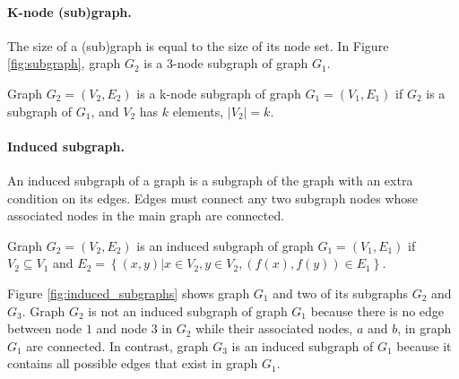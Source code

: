 \paragraph{K-node (sub)graph.}
The size of a (sub)graph is equal to the size of its node set. 
In Figure \ref{fig:subgraph}, graph $G_2$ is a 3-node subgraph of graph $G_1$. 

\begin{definition}
Graph $G_2 = \left( V_2 , E_2 \right)$ is a k-node subgraph of graph $G_1 = \left( V_1, E_1 \right)$ if $G_2$ is a subgraph of $G_1$, and $V_2$ has $k$ elements, $|V_2|=k$. 
\end{definition}

\paragraph{Induced subgraph.} 
An induced subgraph of a graph is a subgraph of the graph with an extra condition on its edges.  
Edges must connect any two subgraph nodes whose associated nodes in the main graph are connected. 

\begin{definition} 
Graph $G_2 = (V_2, E_2)$ is an induced subgraph of graph $G_1 = (V_1, E_1)$ if $V_2 \subseteq V_1$ and 
$E_2 = \left\{ (x,y)| x \in V_2, y \in V_2, (f(x),f(y)) \in E_1  \right\}$.
\end{definition}

Figure \ref{fig:induced_subgraphs} shows graph $G_1$ and two of its subgraphs $G_2$ and $G_3$.  
Graph $G_2$ is not an induced subgraph of graph $G_1$ because there is no edge between node $1$ and node $3$ in $G_2$ while their associated nodes, $a$ and $b$, in graph $G_1$ are connected. 
In contrast, graph $G_3$ is an induced subgraph of $G_1$ because it contains all possible edges that exist in graph $G_1$. 

